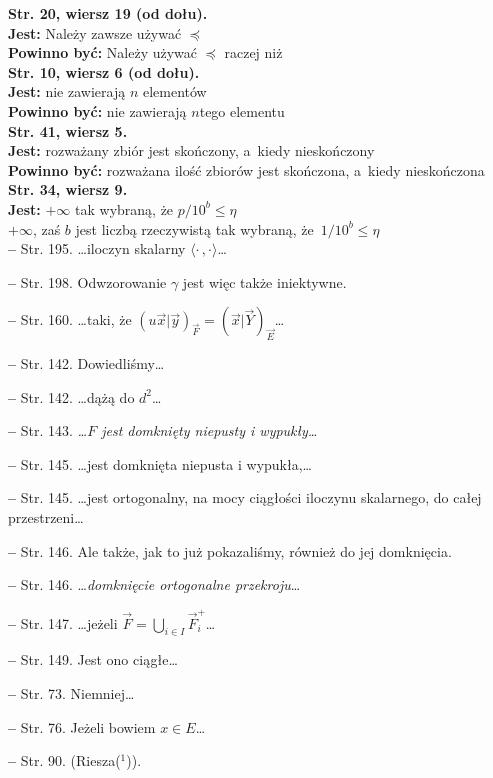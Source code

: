 \documentclass[a4paper]{article}
\newcommand{\tb}{\textbf}
\newcommand{\noi}{\noindent}
\newcommand{\start}{\noi \tb{--} {}}
\newcommand{\StrWg}[2]{\tb{Str. #1, wiersz #2.}}
\newcommand{\StrWd}[2]{\tb{Str. #1, wiersz #2 (od dołu).}}
\newcommand{\Jest}{\tb{Jest: }}
\newcommand{\Pow}{\tb{Powinno być: }}
\begin{document}
\noi
\StrWd{20}{19} \\
\Jest Należy zawsze używać $\preceq$ \\
\Pow Należy używać $\preceq$ raczej niż \\
\StrWd{10}{6} \\
\Jest nie zawierają $n$ elementów \\
\Pow nie zawierają $n$\dywiz tego elementu \\
\StrWg{41}{5} \\
\Jest rozważany zbiór jest skończony, a~kiedy nieskończony \\
\Pow rozważana ilość zbiorów jest skończona, a~kiedy nieskończona \\
\StrWg{34}{9} \\
\Jest
$+\infty$ tak wybraną, że $p / 10^{ b } \leq \eta$ \\
$+\infty$, zaś $b$ jest liczbą rzeczywistą tak wybraną,
że~$1 / 10^{ b } \leq \eta$ \\


\start Str. 195. \ldots iloczyn skalarny
$\langle \cdot \,, \cdot \rangle$\ldots

\start Str. 198. Odwzorowanie $\gamma$ jest więc także iniektywne.

\start Str. 160. \ldots taki, że
$( u\vec{ x } | \vec{ y } )_{ \vec{ F } } = ( \vec{ x } | \vec{ Y }
)_{ \vec{ E } }$\ldots

\start Str. 142. Dowiedliśmy\ldots

\start Str. 142. \ldots dążą do $d^{ 2 }$\ldots

\start Str. 143. \emph{\ldots$F$ jest domknięty niepusty i
  wypukły\ldots}

\start Str. 145. \ldots jest domknięta niepusta i wypukła,\ldots

\start Str. 145. \ldots jest ortogonalny, na mocy ciągłości iloczynu
skalarnego, do całej przestrzeni\ldots

\start Str. 146. Ale także, jak to już pokazaliśmy, również do jej
domknięcia.

\start Str. 146. \ldots\emph{domknięcie ortogonalne przekroju}\ldots

\start Str. 147. \ldots jeżeli
$\vec{ F } = \bigcup_{ i \in I } \vec{ F }_{ i }^{ + }$\ldots

\start Str. 149. Jest ono ciągłe\ldots

\start Str. 73. Niemniej\ldots

\start Str. 76. Jeżeli bowiem $x \in E$\ldots

\start Str. 90. \large{(Riesza($^{ 1 }$))}.
\end{document}
